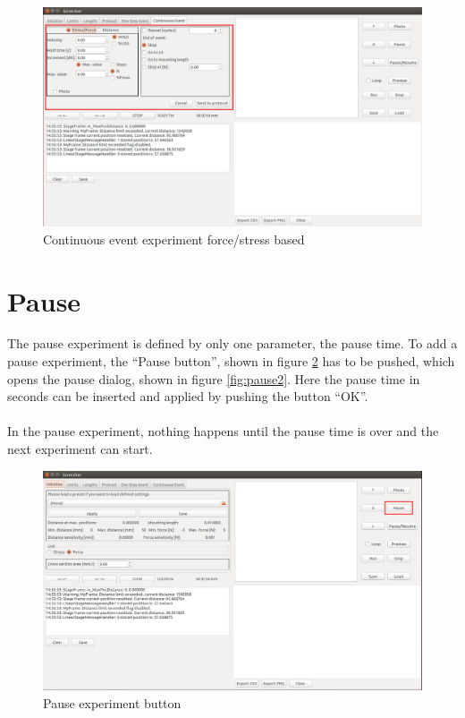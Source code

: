 \begin{figure}[!ht]
	\centering
		\includegraphics[width=1.0\textwidth]{images/ContinuousEventStressForce}
	\caption{Continuous event experiment force/stress based}
	\label{fig:continuouseventforcestress}
\end{figure}

\section{Pause}
The pause experiment is defined by only one parameter, the pause time. To add a pause experiment, the ``Pause button'', shown in figure \ref{fig:pause1} has to be pushed, which opens the pause dialog, shown in figure \ref{fig:pause2}. Here the pause time in seconds can be inserted and applied by pushing the button ``OK''.
\\
\\
In the pause experiment, nothing happens until the pause time is over and the next experiment can start.

\begin{figure}[!ht]
	\centering
		\includegraphics[width=1.0\textwidth]{images/Pause1}
	\caption{Pause experiment button}
	\label{fig:pause1}
\end{figure}

